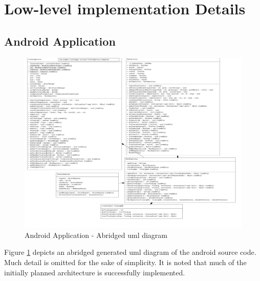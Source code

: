 \appendices

\section{Low-level implementation Details}\label{uml}
\subsection{Android Application}\label{App:android}
\begin{figure}[H]
\centering
\includegraphics[width=6.5in]{uml_android.png}
\caption{Android Application - Abridged \ac{uml} diagram}
\label{fig:uml_android}
\end{figure}

Figure \ref{fig:uml_android} depicts an abridged generated \ac{uml} diagram of the android source code.
Much detail is omitted for the sake of simplicity.
It is noted that much of the initially planned architecture is successfully implemented.
\pagebreak

